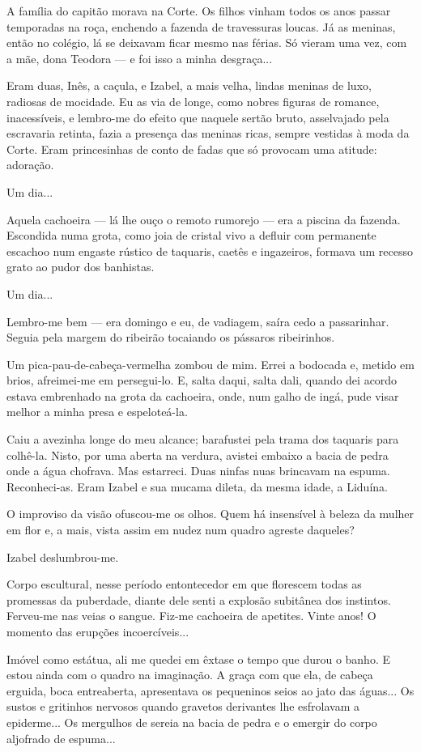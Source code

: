 A família do capitão morava na Corte. Os filhos vinham todos os anos
passar temporadas na roça, enchendo a fazenda de travessuras loucas. Já
as meninas, então no colégio, lá se deixavam ficar mesmo nas férias. Só
vieram uma vez, com a mãe, dona Teodora --- e foi isso a minha
desgraça...

Eram duas, Inês, a caçula, e Izabel, a mais velha, lindas meninas de
luxo, radiosas de mocidade. Eu as via de longe, como nobres figuras de
romance, inacessíveis, e lembro-me do efeito que naquele sertão bruto,
asselvajado pela escravaria retinta, fazia a presença das meninas ricas,
sempre vestidas à moda da Corte. Eram princesinhas de conto de fadas que
só provocam uma atitude: adoração.

Um dia...

Aquela cachoeira --- lá lhe ouço o remoto rumorejo --- era a piscina da
fazenda. Escondida numa grota, como joia de cristal vivo a defluir com
permanente escachoo num engaste rústico de taquaris, caetês e
ingazeiros, formava um recesso grato ao pudor dos banhistas.

Um dia...

Lembro-me bem --- era domingo e eu, de vadiagem, saíra cedo a
passarinhar. Seguia pela margem do ribeirão tocaiando os pássaros
ribeirinhos.

Um pica-pau-de-cabeça-vermelha zombou de mim. Errei a bodocada e, metido
em brios, afreimei-me em persegui-lo. E, salta daqui, salta dali, quando
dei acordo estava embrenhado na grota da cachoeira, onde, num galho de
ingá, pude visar melhor a minha presa e espeloteá-la.

Caiu a avezinha longe do meu alcance; barafustei pela trama dos taquaris
para colhê-la. Nisto, por uma aberta na verdura, avistei embaixo a bacia
de pedra onde a água chofrava. Mas estarreci. Duas ninfas nuas brincavam
na espuma. Reconheci-as. Eram Izabel e sua mucama dileta, da mesma
idade, a Liduína.

O improviso da visão ofuscou-me os olhos. Quem há insensível à beleza da
mulher em flor e, a mais, vista assim em nudez num quadro agreste
daqueles?

Izabel deslumbrou-me.

Corpo escultural, nesse período entontecedor em que florescem todas as
promessas da puberdade, diante dele senti a explosão subitânea dos
instintos. Ferveu-me nas veias o sangue. Fiz-me cachoeira de apetites.
Vinte anos! O momento das erupções incoercíveis...

Imóvel como estátua, ali me quedei em êxtase o tempo que durou o banho.
E estou ainda com o quadro na imaginação. A graça com que ela, de cabeça
erguida, boca entreaberta, apresentava os pequeninos seios ao jato das
águas... Os sustos e gritinhos nervosos quando gravetos derivantes lhe
esfrolavam a epiderme... Os mergulhos de sereia na bacia de pedra e o
emergir do corpo aljofrado de espuma...


